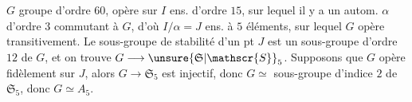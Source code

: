 $G$ groupe d'ordre $60$, opère  sur $I$ ens. d'ordre $15$, sur lequel il y a un autom. $\alpha$ d'ordre $3$ commutant à $G$, d'où $I/\alpha=J$ ens. à $5$ éléments, sur lequel $G$ opère transitivement. Le sous-groupe de stabilité d'un pt  $J$ est un sous-groupe  d'ordre $12$ de $G$, et on trouve  $G\longrightarrow\unsure{\mathfrak{S}|\mathscr{S}}_5$. Supposons  que $G$ opère fidèlement sur $J$, alors $G\longrightarrow\mathfrak{S}_5$ est injectif, donc $G\simeq$ sous-groupe d'indice $2$ de $\mathfrak{S}_5$, donc $G\simeq A_5$.


